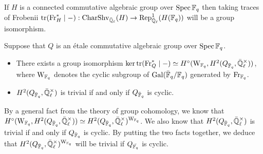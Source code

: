         \begin{lemma} \label{lemma: sheaf_function_correspondence_for_connected_algebraic_groups}
            \cite[Proposition 1.14]{cunningham_roe_function_sheaf_dictionary_quasi_characters_p_adic_tori} If $H$ is a connected commutative algebraic group over $\operatorname{Spec} \mathbb{F}_q$ then taking traces of Frobenii $\operatorname{tr}(\mathrm{Fr}_H^* \mid -): \mathrm{Char}\mathrm{Shv}_{\bar{\mathbb{Q}}_{\ell}}(H) \to \mathrm{Rep}_{\bar{\mathbb{Q}}_{\ell}}^1(H(\mathbb{F}_q))$ will be a group isomorphism.
        \end{lemma}
        \begin{lemma} \label{lemma: sheaf_function_correspondence_for_etale_commutative_group_schemes}
            Suppose that $Q$ is an \'etale commutative algebraic group over $\operatorname{Spec} \mathbb{F}_q$.
            \begin{itemize}
                \item \cite[Proposition 2.7]{cunningham_roe_function_sheaf_dictionary_quasi_characters_p_adic_tori} There exists a group isomorphism $\ker \trace(\Frob_Q^* \mid -) \cong H^{\circ}(\rmW_{\F_q}, H^2(Q_{\bar{\F}_q}, \bar{\Q}_{\ell}^{\x}))$, where $\mathrm{W}_{\mathbb{F}_q}$ denotes the cyclic subgroup of $\mathrm{Gal}(\bar{\mathbb{F}}_q/\mathbb{F}_q)$ generated by $\mathrm{Fr}_{\mathbb{F}_q}$. 
                \item \cite[Remark 2.9]{cunningham_roe_function_sheaf_dictionary_quasi_characters_p_adic_tori} $H^2(Q_{\bar{\F}_q}, \bar{\Q}_{\ell}^{\x})$ is trivial if and only if $Q_{\bar{\mathbb{F}}_q}$ is cyclic.
            \end{itemize}
        \end{lemma}
        \begin{corollary} \label{coro: kernels_of_traces_of_frobenii_on_etale_group_schemes}
            By a general fact from the theory of group cohomology, we know that $H^{\circ}(\rmW_{\F_q}, H^2(Q_{\bar{\F}_q}, \bar{\Q}_{\ell}^{\x})) \cong H^2(Q_{\bar{\F}_q}, \bar{\Q}_{\ell}^{\x})^{\rmW_{\F_q}}$. We also know that $H^2(Q_{\bar{\F}_q}, \bar{\Q}_{\ell}^{\x})$ is trivial if and only if $Q_{\bar{\mathbb{F}}_q}$ is cyclic. By putting the two facts together, we deduce that $H^2(Q_{\bar{\F}_q}, \bar{\Q}_{\ell}^{\x})^{\rmW_{\F_q}}$ will be trivial if $Q_{\bar{\mathbb{F}_q}}$ is cyclic. 
        \end{corollary}
        
